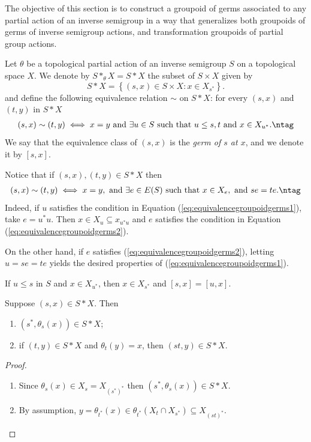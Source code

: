 The objective of this section is to construct a groupoid of germs associated to any partial action of an inverse semigroup in a way that generalizes both groupoids of germs of inverse semigroup actions, and transformation groupoids of partial group actions.

Let $\theta$ be a topological partial action of an inverse semigroup $S$ on a topological space $X$. We denote by $S\ast_\theta X=S\ast X$ the subset of $S \times X$ given by
\[S\ast X= \left\lbrace (s,x) \in S \times X:x \in X_{s^*} \right\rbrace.\]
and define the following equivalence relation $\sim$ on $S\ast X$: for every $(s,x)$ and $(t,y)$ in $S\ast X$
\begin{align*}
(s,x) \sim (t,y)\iff x=y\text{ and }\exists u\in S\text{ such that }u \leq s,t\text{ and }x \in X_{u^*}.\ntag\label{eq:equivalencegroupoidgerms1}
\end{align*}
We say that the equivalence class of $(s,x)$ is the \emph{germ of $s$ at $x$}, and we denote it by $[s,x]$.

\begin{remarkn}\label{equivalence2groupoidofgermes}
Notice that if $(s,x),(t,y) \in S\ast X$ then 
\begin{align*}
(s,x) \sim (t,y)\iff x=y,\text{ and }\exists e\in E(S)\text{ such that }x \in X_e,\text{ and }se=te.\ntag\label{eq:equivalencegroupoidgerms2}
\end{align*}
Indeed, if $u$ satisfies the condition in Equation (\ref{eq:equivalencegroupoidgerms1}), take $e=u^*u$. Then $x\in X_u\subseteq x_{u^*u}$ and $e$ satisfies the condition in Equation (\ref{eq:equivalencegroupoidgerms2}).

On the other hand, if $e$ satisfies (\ref{eq:equivalencegroupoidgerms2}), letting $u=se=te$ yields the desired properties of (\ref{eq:equivalencegroupoidgerms1}).
\end{remarkn}

\begin{remarkn}\label{changebygreater}
If $u\leq s$ in $S$ and $x\in X_{u^*}$, then $x\in X_{s^*}$ and $[s,x]=[u,x]$.%
\end{remarkn}

\begin{lemma}\label{lemmasastx}
Suppose $(s,x)\in S\ast X$. Then
\begin{enumerate}\setlength\itemsep{1ex}
\item[(a)] $(s^*,\theta_s(x))\in S\ast X$;
\item[(b)] if $(t,y)\in S\ast X$ and $\theta_t(y)=x$, then $(st,y)\in S\ast X$.
\end{enumerate}
\end{lemma}
\begin{proof}
\begin{enumerate}\setlength\itemsep{1ex}
\item[(a)] Since $\theta_s(x)\in X_s=X_{(s^*)^*}$ then $(s^*,\theta_s(x))\in S\ast X$.
\item[(b)] By assumption, $y=\theta_{t^*}(x) \in \theta_{t^*}(X_t\cap X_{s^*})\subseteq X_{(st)^*}$.\qedhere
\end{enumerate}
\end{proof}

